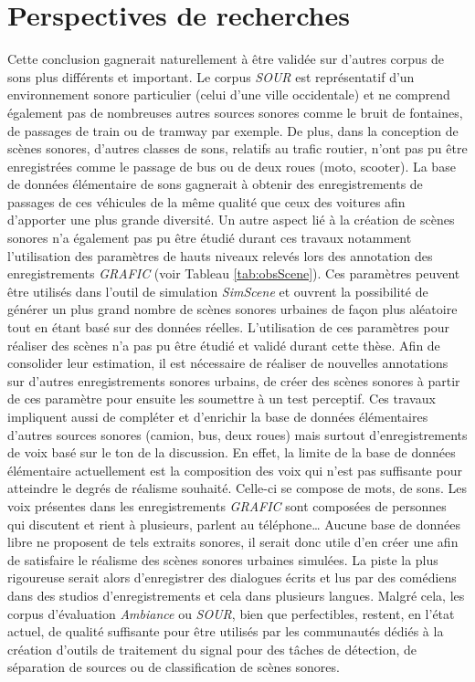 \section*{Perspectives de recherches}
Cette conclusion gagnerait naturellement à être validée sur d'autres corpus de sons plus différents et important. Le corpus \textit{SOUR} est représentatif d'un environnement sonore particulier (celui d'une ville occidentale) et ne comprend également pas de nombreuses autres sources sonores comme le bruit de fontaines, de passages de train ou de tramway par exemple. De plus, dans la conception de scènes sonores, d'autres classes de sons, relatifs au trafic routier, n'ont pas pu être enregistrées comme le passage de bus ou de deux roues (moto, scooter). La base de données élémentaire de sons gagnerait à obtenir des enregistrements de passages de ces véhicules de la même qualité que ceux des voitures afin d'apporter une plus grande diversité. 
Un autre aspect lié à la création de scènes sonores n'a également pas pu être étudié durant ces travaux notamment l'utilisation des paramètres de hauts niveaux relevés lors des annotation des enregistrements \textit{GRAFIC} (voir Tableau \ref{tab:obsScene}).
Ces paramètres peuvent être utilisés dans l'outil de simulation \textit{SimScene} et ouvrent la possibilité de générer un plus grand nombre de scènes sonores urbaines de façon plus aléatoire tout en étant basé sur des données réelles. L'utilisation de ces paramètres pour réaliser des scènes n'a pas pu être étudié et validé durant cette thèse. Afin de consolider leur estimation, il est nécessaire de réaliser de nouvelles annotations sur d'autres enregistrements sonores urbains, de créer des scènes sonores à partir de ces paramètre pour ensuite les soumettre à un test perceptif.
Ces travaux impliquent aussi de compléter et d'enrichir la base de données élémentaires d'autres sources sonores (camion, bus, deux roues) mais surtout d'enregistrements de voix basé sur le ton de la discussion. En effet, la limite de la base de données élémentaire actuellement est la composition des voix qui n'est pas suffisante pour atteindre le degrés de réalisme souhaité. Celle-ci se compose de mots, de sons. Les voix présentes dans les enregistrements \textit{GRAFIC} sont composées de personnes qui discutent et rient à plusieurs, parlent au téléphone\dots{} Aucune base de données libre ne proposent de tels extraits sonores, il serait donc utile d'en créer une afin de satisfaire le réalisme des scènes sonores urbaines simulées. La piste la plus rigoureuse serait alors d'enregistrer des dialogues écrits et lus par des comédiens dans des studios d'enregistrements et cela dans plusieurs langues. Malgré cela, les corpus d'évaluation \textit{Ambiance} ou \textit{SOUR}, bien que perfectibles, restent, en l'état actuel, de qualité suffisante pour être utilisés par les communautés dédiés à la création d'outils de traitement du signal pour des tâches de détection, de séparation de sources ou de classification de scènes sonores.

